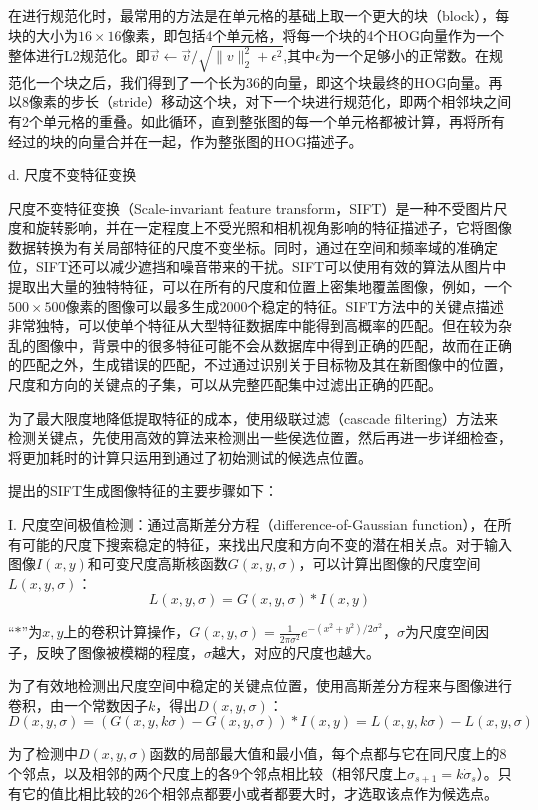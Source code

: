   在进行规范化时，最常用的方法是在单元格的基础上取一个更大的块（block），每块的大小为$16\times16$像素，即包括4个单元格，将每一个块的4个HOG向量作为一个整体进行L2规范化。即$\vec{v}\leftarrow\vec{v}/\sqrt{\lVert v \rVert^2_2 + \epsilon^2}$,其中$\epsilon$为一个足够小的正常数。在规范化一个块之后，我们得到了一个长为36的向量，即这个块最终的HOG向量。再以8像素的步长（stride）移动这个块，对下一个块进行规范化，即两个相邻块之间有2个单元格的重叠。如此循环，直到整张图的每一个单元格都被计算，再将所有经过的块的向量合并在一起，作为整张图的HOG描述子。

  d. 尺度不变特征变换

  尺度不变特征变换（Scale-invariant feature transform，SIFT）是一种不受图片尺度和旋转影响，并在一定程度上不受光照和相机视角影响的特征描述子，它将图像数据转换为有关局部特征的尺度不变坐标。同时，通过在空间和频率域的准确定位，SIFT还可以减少遮挡和噪音带来的干扰。SIFT可以使用有效的算法从图片中提取出大量的独特特征，可以在所有的尺度和位置上密集地覆盖图像，例如，一个$500\times500$像素的图像可以最多生成2000个稳定的特征。SIFT方法中的关键点描述非常独特，可以使单个特征从大型特征数据库中能得到高概率的匹配。但在较为杂乱的图像中，背景中的很多特征可能不会从数据库中得到正确的匹配，故而在正确的匹配之外，生成错误的匹配，不过通过识别关于目标物及其在新图像中的位置，尺度和方向的关键点的子集，可以从完整匹配集中过滤出正确的匹配\cite{lowe2004distinctive}。

  为了最大限度地降低提取特征的成本，使用级联过滤（cascade filtering）方法来检测关键点，先使用高效的算法来检测出一些侯选位置，然后再进一步详细检查，将更加耗时的计算只运用到通过了初始测试的候选点位置。

  \citet{lowe2004distinctive}提出的SIFT生成图像特征的主要步骤如下：

  I. 尺度空间极值检测：通过高斯差分方程（difference-of-Gaussian function），在所有可能的尺度下搜索稳定的特征，来找出尺度和方向不变的潜在相关点。对于输入图像$I(x,y)$和可变尺度高斯核函数$G(x,y,\sigma)$，可以计算出图像的尺度空间$L(x,y,\sigma)$：
$$L(x,y,\sigma)=G(x,y,\sigma)\ast I(x,y)$$

  “$\ast$”为$x,y$上的卷积计算操作，$G(x,y,\sigma)=\frac{1}{2\pi\sigma^2}e^{-(x^2+y^2)/2\sigma^2}$，$\sigma$为尺度空间因子，反映了图像被模糊的程度，$\sigma$越大，对应的尺度也越大。

  为了有效地检测出尺度空间中稳定的关键点位置，使用高斯差分方程来与图像进行卷积，由一个常数因子$k$，得出$D(x,y,\sigma)$：
$$D(x,y,\sigma)=(G(x,y,k\sigma)-G(x,y,\sigma))\ast I(x,y)=L(x,y,k\sigma)-L(x,y,\sigma)$$

  为了检测中$D(x,y,\sigma)$函数的局部最大值和最小值，每个点都与它在同尺度上的8个邻点，以及相邻的两个尺度上的各9个邻点相比较（相邻尺度上$\sigma_{s+1}=k\dot\sigma_s$）。只有它的值比相比较的26个相邻点都要小或者都要大时，才选取该点作为候选点。

